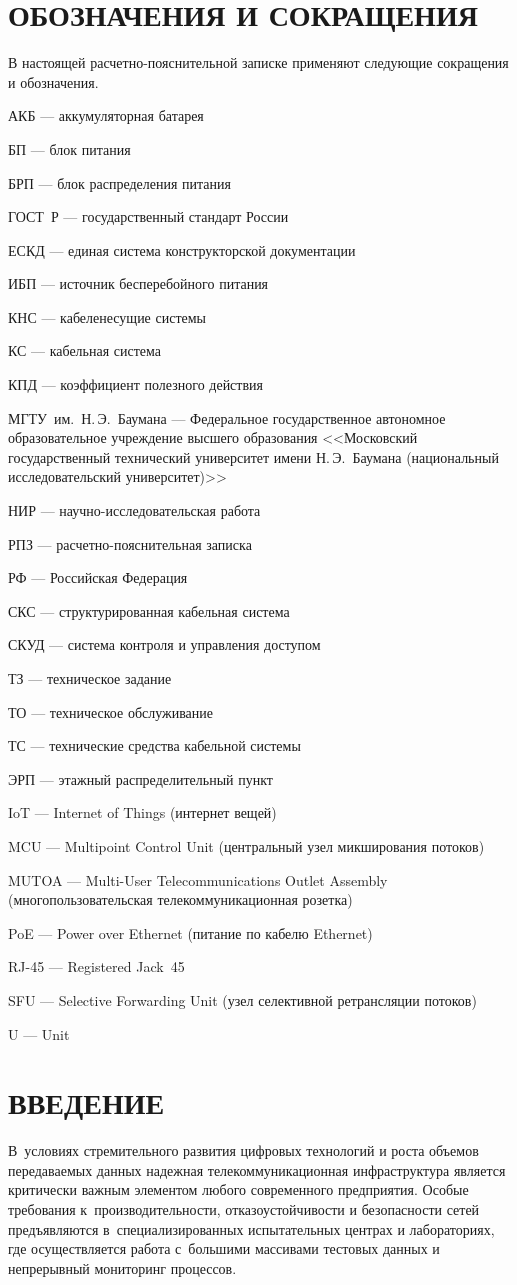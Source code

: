 \documentclass[a4paper,oneside,14pt]{extreport}
\newcommand{\definition}[2]{\item \noindent #1 --- #2}
\newenvironment{abbreviations}{
	\chapter*{ОБОЗНАЧЕНИЯ И СОКРАЩЕНИЯ}
	\addcontentsline{toc}{chapter}{ОБОЗНАЧЕНИЯ И СОКРАЩЕНИЯ}
	В настоящей расчетно-пояснительной записке применяют следующие сокращения и обозначения.
	\begin{description}[leftmargin=0pt]
}{
	\end{description}
}
\newcommand{\maketableofcontents}{
	\renewcommand\contentsname{СОДЕРЖАНИЕ}
	\tableofcontents
}
\begin{document}
\begin{abbreviations}
\definition{АКБ}{аккумуляторная батарея}
\definition{БП}{блок питания}
\definition{БРП}{блок распределения питания}
\definition{ГОСТ~Р}{государственный стандарт России}
\definition{ЕСКД}{единая система конструкторской документации}
\definition{ИБП}{источник бесперебойного питания}
\definition{КНС}{кабеленесущие системы}
\definition{КС}{кабельная система}
\definition{КПД}{коэффициент полезного действия}
\definition{МГТУ~им.~Н.\,Э.~Баумана}{Федеральное государственное автономное образовательное учреждение высшего образования <<Московский государственный технический университет имени Н.\,Э.~Баумана (национальный исследовательский университет)>>}
\definition{НИР}{научно-исследовательская работа}
\definition{РПЗ}{расчетно-пояснительная записка}
\definition{РФ}{Российская Федерация}
\definition{СКС}{структурированная кабельная система}
\definition{СКУД}{система контроля и управления доступом}
\definition{ТЗ}{техническое задание}
\definition{ТО}{техническое обслуживание}
\definition{ТС}{технические средства кабельной системы}
\definition{ЭРП}{этажный распределительный пункт}
\definition{IoT}{Internet of Things (интернет вещей)}
\definition{MCU}{Multipoint Control Unit (центральный узел микширования потоков)}
\definition{MUTOA}{Multi-User Telecommunications Outlet Assembly (многопользовательская телекоммуникационная розетка)}
\definition{PoE}{Power over Ethernet (питание по кабелю Ethernet)}
\definition{RJ-45}{Registered Jack~45}
\definition{SFU}{Selective Forwarding Unit (узел селективной ретрансляции потоков)}
\definition{U}{Unit}
\end{abbreviations}

\maketableofcontents

\chapter*{ВВЕДЕНИЕ}

В~условиях стремительного развития цифровых технологий и роста объемов передаваемых данных надежная телекоммуникационная инфраструктура является критически важным элементом любого современного предприятия. Особые требования к~производительности, отказоустойчивости и безопасности сетей предъявляются в~специализированных испытательных центрах и лабораториях, где осуществляется работа с~большими массивами тестовых данных и непрерывный мониторинг процессов.
\end{document}
